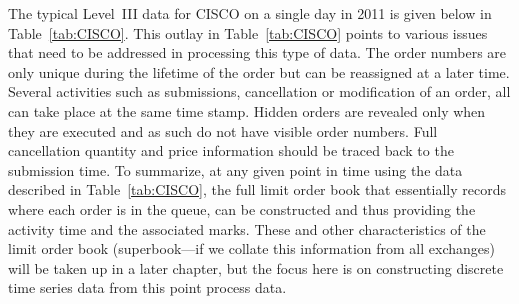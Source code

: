 The typical Level~III data for CISCO on a single day in 2011 is given below in Table~\ref{tab:CISCO}. This outlay in Table~\ref{tab:CISCO} points to various issues that need to be addressed in processing this type of data. The order numbers are only unique during the lifetime of the order but can be reassigned at a later time. Several activities such as submissions, cancellation or modification of an order, all can take place at the same time stamp. Hidden orders are revealed only when they are executed and as such do not have visible order numbers. Full cancellation quantity and price information should be traced back to the submission time. To summarize, at any given point in time using the data described in Table~\ref{tab:CISCO}, the full limit order book that essentially records where each order is in the queue, can be constructed and thus providing the activity time and the associated marks. These and other characteristics of the limit order book (superbook---if we collate this information from all exchanges) will be taken up in a later chapter, but the focus here is on constructing discrete time series data from this point process data. 
